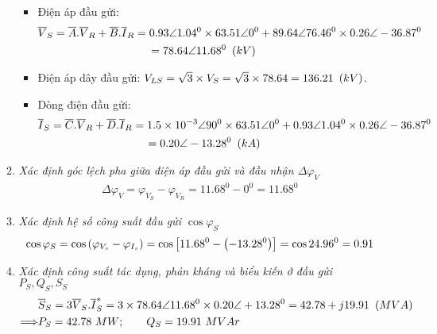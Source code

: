 \begin{enumerate}
\begin{enumerate}[ \it a.]
\begin{itemize}
						\item Điện áp đầu gửi:
							\begin{align*}
								\overline{V}_S  & = \overline{A}. \overline{V}_R + \overline{B}.\overline{I}_R  = 0.93 \angle 1.04^0 \times 63.51 \angle 0^0+ 89.64 \angle 76.46^0 \times 0.26 \angle -36.87^0\\
								& \hspace{3cm}= 78.64 \angle 11.68^0 \unitp{kV}
							\end{align*}
						
						\item Điện áp dây đầu gửi: $V_{LS} = \sqrt{3} \times V_S = \sqrt{3} \times 78.64 = 136.21 ~\left({kV}\right)$.						
						
						\item Dòng điện đầu gửi:
							\begin{align*}
								\overline{I}_S & = \overline{C}. \overline{V}_R + \overline{D}.\overline{I}_R = 1.5 \times 10^{-3} \angle 90^0 \times 63.51 \angle 0^0 + 0.93 \angle 1.04^0 \times 0.26 \angle -36.87^0 \\ 
								& \hspace{3cm}= 0.20 \angle -13.28^0 \unitp{kA}
							\end{align*}
					\end{itemize}					
				
				\item \emph{Xác định góc lệch pha giữa điện áp đầu gửi và đầu nhận $\Delta \varphi_V$}
						\begin{align*}
							\Delta \varphi_V = \varphi_{V_S} - \varphi_{V_R} = 11.68^0 - 0^0 = 11.68^0
						\end{align*}
					
				\item \emph{Xác định hệ số công suất đầu gửi $\cos \varphi_S$}
					\begin{align*}
						\cos \varphi_S  = \cos \left({\varphi_{V_s} - \varphi_{I_{s}}}\right)= \cos \left[{11.68^0 - \left({-13.28^0}\right)} \right] = \cos 24.96^0 = 0.91	
					\end{align*}							
				
				\item \emph{Xác định công suất tác dụng, phản kháng và biểu kiến ở đầu gửi $P_S, Q_S, S_S$}
					\begin{align*}
						&\overline{S}_S  = 3 \overline{V}_S.\overline{I}_S^{\ast} = 3 \times 78.64 \angle 11.68^0 \times 0.20 \angle +13.28^0 = 42.78 + j19.91 ~\left({MVA}\right)\\
						\Longrightarrow & P_S  = 42.78 ~MW; \qquad Q_S = 19.91 ~MVAr
					\end{align*}
					

\end{enumerate}
\end{enumerate}
